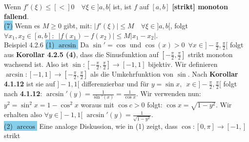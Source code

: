 \documentclass[landscape, 10pt]{article}
\begin{document}
\begin{multicols}{3}
                            Wenn \textcolor{NavyBlue}{
                            $f'(\xi)\leqslant[<]0\quad\forall\xi\in]a,b[$} ist, 
                            ist \textcolor{NavyBlue}{$f$} auf 
                            \textcolor{NavyBlue}{$[a,b]$} 
                            \textbf{[strikt] monoton fallend}.\\
                     \colorbox{SkyBlue}{(7)} Wenn es 
                            \textcolor{NavyBlue}{$M\geqslant0$} gibt, mit: 
                            \textcolor{NavyBlue}{
                            $|f'(\xi)|\leqslant M\quad\forall\xi\in]a,b[$}, 
                            folgt \textcolor{NavyBlue}{ 
                            $\forall x_1,x_2\in[a,b]:\enspace
                            |f(x_1)-f(x_2)|\leqslant M|x_1-x_2|$}. \\
              \colorbox{Dandelion}{Beispiel 4.2.6}
                     \colorbox{SkyBlue}{(1) $\arcsin$} 
                            Da $\sin'=\cos$ und 
                            $\cos(x)>0\enspace
                            \forall x\in]-\frac{\pi}{2},\frac{\pi}{2}[$
                            folgt aus \textbf{Korollar 4.2.5 (4)}, dass die 
                            Sinusfunktion auf
                            $[-\frac{\pi}{2},\frac{\pi}{2}]$ strikt 
                            monoton wachsend
                            ist. Also ist 
                            $\sin:[-\frac{\pi}{2},\frac{\pi}{2}]\longrightarrow[-1,1]$ 
                            bijektiv. Wir definieren
                            $\arcsin:[-1,1]\longrightarrow[-\frac{\pi}{2},\frac{\pi}{2}]$
                            als die Umkehrfunktion von $\sin$. Nach 
                            \textbf{Korollar 4.1.12} 
                            ist sie auf $]-1,1[$ differenzierbar und für
                            $y=\sin x,\enspace x\in]-\frac{\pi}{2},\frac{\pi}{2}[$
                            folgt nach \textbf{4.1.12}:
                            $\arcsin'(y)=\frac{1}{\sin'(x)}=\frac{1}{\cos x}$.
                            Wir verwenden nun: $y^2=\sin^2x=1-\cos^2x$
                            woraus mit $\cos c>0$ folgt:
                            $\cos x=\sqrt{1-y^2}$. Wir erhalten also 
                            $\forall y\in ]-1,1[$
                            $\arcsin'(y)=\frac{1}{\sqrt{1-y^2}}$.\\
                     \colorbox{SkyBlue}{(2) $\arccos$}
                            Eine analoge Diskussion, wie in (1) zeigt, dass
                            $\cos:[0,\pi]\longrightarrow[-1,]$ strikt 

\end{multicols}
\end{document}
